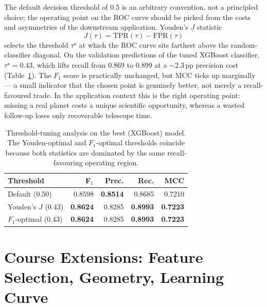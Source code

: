 \documentclass[conference]{IEEEtran}
\begin{document}
The default decision threshold of $0.5$ is an arbitrary convention,
not a principled choice; the operating point on the ROC curve
should be picked from the costs and asymmetries of the downstream
application. Youden's $J$ statistic~\cite{youden1950index}
\begin{equation}
  J(\tau) = \mathrm{TPR}(\tau) - \mathrm{FPR}(\tau)
\end{equation}
selects the threshold $\tau^{\star}$ at which the ROC curve sits
farthest above the random-classifier diagonal. On the validation
predictions of the tuned XGBoost classifier, $\tau^{\star} = 0.43$,
which lifts recall from $0.869$ to $0.899$ at a $\sim 2.3$\,pp
precision cost (Table~\ref{tab:threshold}). The $F_1$ score is
practically unchanged, but MCC ticks up marginally --- a small
indicator that the chosen point is genuinely better, not merely a
recall-favoured trade. In the application context this is the
right operating point: missing a real planet costs a unique
scientific opportunity, whereas a wasted follow-up loses only
recoverable telescope time.

\begin{table}[!t]
\centering
\caption{Threshold-tuning analysis on the best (XGBoost) model.
The Youden-optimal and $F_1$-optimal thresholds coincide because
both statistics are dominated by the same recall-favouring
operating region.}
\label{tab:threshold}
\begin{tabular}{lrrrr}
\toprule
\textbf{Threshold} & \textbf{F$_1$} & \textbf{Prec.} & \textbf{Rec.} &
\textbf{MCC} \\
\midrule
Default (0.50)        & 0.8598 & \textbf{0.8514} & 0.8685 & 0.7210 \\
Youden's $J$ (0.43)   & \textbf{0.8624} & 0.8285 & \textbf{0.8993}
                      & \textbf{0.7223} \\
$F_1$-optimal (0.43)  & \textbf{0.8624} & 0.8285 & \textbf{0.8993}
                      & \textbf{0.7223} \\
\bottomrule
\end{tabular}
\end{table}

\section{Course Extensions: Feature Selection, Geometry,
         Learning Curve}\label{sec:extensions}
\end{document}
